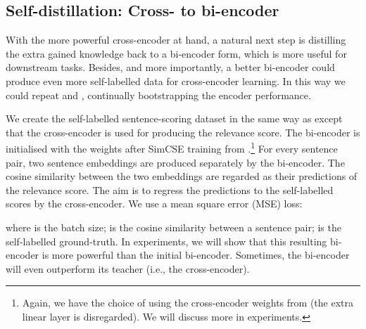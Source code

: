 \documentclass{article} \usepackage{iclr2021_conference,times}
\begin{document}
\subsection{Self-distillation: Cross- to bi-encoder}\label{sec:cross_to_bi}

With the more powerful cross-encoder at hand, a natural next step is distilling the extra gained knowledge back to a bi-encoder form, which is more useful for downstream tasks. Besides, and more importantly, a better bi-encoder could produce even more self-labelled data for cross-encoder learning.  In this way we could repeat  and , continually bootstrapping the encoder performance.

We create the self-labelled sentence-scoring dataset in the same way as  except that the cross-encoder is used for producing the relevance score. The bi-encoder is initialised with the weights after SimCSE training from .\footnote{Again, we have the choice of using the cross-encoder weights from  (the extra linear layer is disregarded). We will discuss more in experiments.} For every sentence pair, two sentence embeddings are produced separately by the bi-encoder. The cosine similarity between the two embeddings are regarded as their predictions of the relevance score. The aim is to regress the predictions to the self-labelled scores by the cross-encoder. We use a mean square error (MSE) loss:

where  is the batch size;  is the cosine similarity between a sentence pair;  is the self-labelled ground-truth. In experiments, we will show that this resulting bi-encoder is more powerful than the initial bi-encoder. Sometimes, the bi-encoder will even outperform its teacher (i.e., the cross-encoder). 
\end{document}
